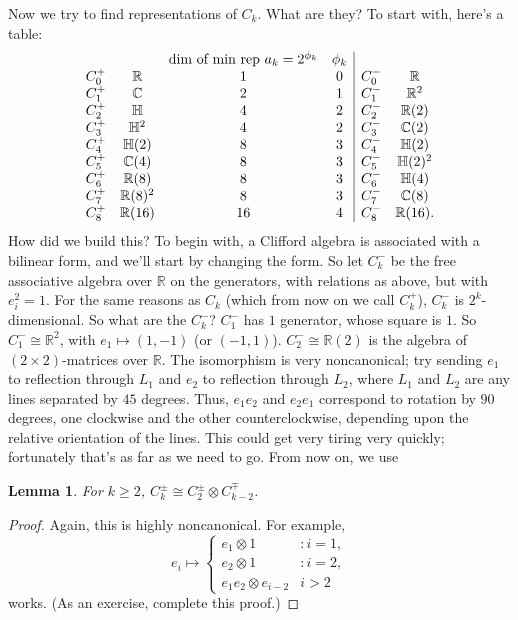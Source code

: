\documentclass{article}
\newcommand{\C}{\mathbb{C}}
\newcommand{\R}{\mathbb{R}}
\newtheorem{lem}[thm]{Lemma}
\begin{document}
Now we try to find representations of $C_k$.  What are they?  To start with, here's a table:
\[\begin{array}{cccc|cc} %
& & \hbox{dim of min rep $a_k = 2^{\phi_k}$} & \phi_k \\
C_0^+ & \R & 1 & 0 & C_0^- & \R \\
C_1^+ & \C & 2 & 1 & C_1^- & \R^2 \\
C_2^+ & \mathbb{H} & 4 & 2 & C_2^- & \R(2) \\
C_3^+ & \mathbb{H}^2 & 4 & 2 & C_3^- & \C(2) \\
C_4^+ & \mathbb{H}(2) & 8 & 3 & C_4^- & \mathbb{H}(2) \\
C_5^+ & \C(4) & 8 & 3 & C_5^- & \mathbb{H}(2)^2 \\
C_6^+ & \R(8) & 8 & 3 & C_6^- & \mathbb{H}(4) \\
C_7^+ & \R(8)^2 & 8 & 3 & C_7^- & \C(8) \\
C_8^+ & \R(16) & 16 & 4 & C_8^- & \R(16).
\end{array}\] %
How did we build this?  To begin with, a Clifford algebra is associated with a bilinear form, and we'll start by changing the form.  So let $C_k^-$ be the free associative algebra over $\R$ on the generators, with relations as above, %
but with $e_i^2 = 1$.  For the same reasons as $C_k$ (which from now on we call $C_k^+$), $C_k^-$ is $2^k$-dimensional.  So what are the $C_k^-$?  $C_1^-$ has $1$ generator, whose square is $1$.  So $C_1^- \cong \R^2$, with $e_1 \mapsto (1, -1)$ (or $(-1, 1)$).  $C_2^- \cong \R(2)$ is the algebra of $(2 \times 2)$-matrices over $\R$.  The isomorphism is very noncanonical; try sending %
$e_1$ to reflection through $L_1$ and $e_2$ to reflection through $L_2$, where $L_1$ and $L_2$ are any lines separated by $45$ degrees.  Thus, $e_1e_2$ and $e_2e_1$ correspond to rotation by $90$ degrees, one clockwise and the other counterclockwise, depending upon the relative orientation of the lines.  This could get very tiring very quickly; fortunately that's as far as we need to go.  From now on, we use
\begin{lem}
For $k \ge 2$, $C_k^\pm \cong C_2^\pm \otimes C_{k-2}^\mp$.
\end{lem}
\begin{proof}
Again, this is highly noncanonical.  For example,
\[
e_i \mapsto
\begin{cases}
e_1 \otimes 1 & : i = 1, \\
e_2 \otimes 1 & : i = 2, \\
e_1e_2 \otimes e_{i-2} & i > 2
\end{cases}
\]
works.  (As an exercise, complete this proof.)
\end{proof}
\end{document}
